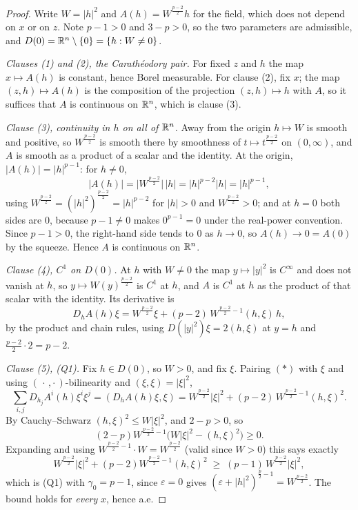 \begin{proof}
Write $W=|h|^2$ and $A(h)=W^{\frac{p-2}2}h$ for the field, which does not
depend on $x$ or on $z$.  Note $p-1>0$ and $3-p>0$, so the two parameters are
admissible, and $D(0)=\mathbb{R}^n\setminus\{0\}=\{h:W\ne0\}$.

\emph{Clauses (1) and (2), the Carath\'eodory pair.}  For fixed $z$ and $h$ the
map $x\mapsto A(h)$ is constant, hence Borel measurable.  For clause (2), fix
$x$; the map $(z,h)\mapsto A(h)$ is the composition of the projection
$(z,h)\mapsto h$ with $A$, so it suffices that $A$ is continuous on $\mathbb{R}^n$,
which is clause (3).

\emph{Clause (3), continuity in $h$ on all of $\mathbb{R}^n$.}  Away from the origin
$h\mapsto W$ is smooth and positive, so $W^{\frac{p-2}2}$ is smooth there by
smoothness of $t\mapsto t^{\frac{p-2}2}$ on $(0,\infty)$, and $A$ is smooth as a
product of a scalar and the identity.  At the origin, $|A(h)|=|h|^{p-1}$: for
$h\ne0$,
\[
|A(h)|=\bigl|W^{\frac{p-2}2}\bigr|\,|h|=|h|^{p-2}|h|=|h|^{p-1},
\]
using $W^{\frac{p-2}2}=(|h|^2)^{\frac{p-2}2}=|h|^{p-2}$ for $|h|>0$ and
$W^{\frac{p-2}2}>0$; and at $h=0$ both sides are $0$, because $p-1\ne0$ makes
$0^{p-1}=0$ under the real-power convention.  Since $p-1>0$, the right-hand side
tends to $0$ as $h\to0$, so $A(h)\to0=A(0)$ by the squeeze.  Hence $A$ is
continuous on $\mathbb{R}^n$.

\emph{Clause (4), $C^1$ on $D(0)$.}  At $h$ with $W\ne0$ the map $y\mapsto|y|^2$
is $C^\infty$ and does not vanish at $h$, so $y\mapsto W(y)^{\frac{p-2}2}$ is
$C^1$ at $h$, and $A$ is $C^1$ at $h$ as the product of that scalar with the
identity.  Its derivative is
\begin{equation}
D_hA(h)\xi=W^{\frac{p-2}2}\xi+(p-2)\,W^{\frac{p-2}2-1}(h,\xi)\,h ,
\tag{$\ast$}
\end{equation}
by the product and chain rules, using $D(|y|^2)\xi=2(h,\xi)$ at $y=h$ and
$\frac{p-2}2\cdot2=p-2$.

\emph{Clause (5), (Q1).}  Fix $h\in D(0)$, so $W>0$, and fix $\xi$.  Pairing
$(\ast)$ with $\xi$ and using $(\,\cdot\,,\cdot\,)$-bilinearity and
$(\xi,\xi)=|\xi|^2$,
\[
\sum_{i,j}D_{h_j}A^i(h)\xi^i\xi^j=(D_hA(h)\xi,\xi)
=W^{\frac{p-2}2}|\xi|^2+(p-2)\,W^{\frac{p-2}2-1}(h,\xi)^2 .
\]
By Cauchy--Schwarz $(h,\xi)^2\le W|\xi|^2$, and $2-p>0$, so
\[
(2-p)W^{\frac{p-2}2-1}\bigl(W|\xi|^2-(h,\xi)^2\bigr)\ge0 .
\]
Expanding and using $W^{\frac{p-2}2-1}\cdot W=W^{\frac{p-2}2}$ (valid since
$W>0$) this says exactly
\[
W^{\frac{p-2}2}|\xi|^2+(p-2)W^{\frac{p-2}2-1}(h,\xi)^2
\;\ge\;(p-1)\,W^{\frac{p-2}2}|\xi|^2 ,
\]
which is (Q1) with $\gamma_0=p-1$, since $\varepsilon=0$ gives
$(\varepsilon+|h|^2)^{\frac p2-1}=W^{\frac{p-2}2}$.  The bound holds for
\emph{every} $x$, hence a.e.


\end{proof}
